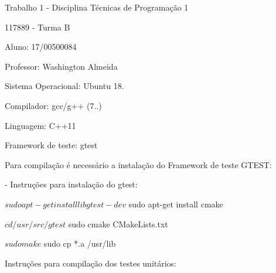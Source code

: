 Trabalho 1 -\/ Disciplina Técnicas de Programação 1

117889 -\/ Turma B

Aluno\+: 17/00500084

Professor\+: Washington Almeida

Sistema Operacional\+: Ubuntu 18.

Compilador\+: gcc/g++ (7..)

Linguagem\+: C++11

Framework de teste\+: gtest

Para compilação é necessário a instalação do Framework de teste G\+T\+E\+ST\+: \begin{DoxyVerb}- Instruções para instalação do gtest:

    $ sudo apt-get install libgtest-dev

    $ sudo apt-get install cmake

    $ cd /usr/src/gtest

    $ sudo cmake CMakeLists.txt

    $ sudo make

    $ sudo cp *.a /usr/lib
\end{DoxyVerb}


Instruções para compilação dos testes unitários\+: 
 